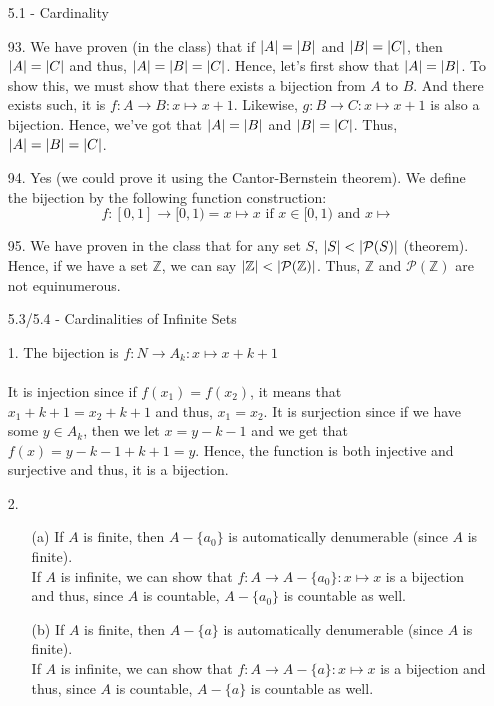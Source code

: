 \documentclass[12pt, a4paper]{article}
\newcommand{\ints}{\mathbb{Z}}
\DeclarePairedDelimiter\abs{\lvert}{\rvert}
\newcommand{\rarr}{\rightarrow}
\begin{document}
\begin{itemize}
\item[]
\item[]
\item[]

{\Large 5.1 - Cardinality}
\item[93.]
We have proven (in the class) that if $\abs{A} = \abs{B}$ and $\abs{B} = \abs{C}$, then $\abs{A} = \abs{C}$ and thus, $\abs{A} = \abs{B} = \abs{C}$.
Hence, let's first show that $\abs{A} = \abs{B}$. To show this, we must show that there exists a bijection from $A$ to $B$.
And there exists such, it is $f : A \rarr B : x \mapsto x + 1$. Likewise, $g : B \rarr C : x \mapsto x + 1$ is also a bijection.
Hence, we've got that $\abs{A} = \abs{B}$ and $\abs{B} = \abs{C}$. Thus, $\abs{A} = \abs{B} = \abs{C}$.

\item[]

\item[94.]
Yes (we could prove it using the Cantor-Bernstein theorem).
We define the bijection by the following function construction:
$$f : [0, 1] \rarr [0, 1)=  x \mapsto x \mbox{ if } x \in [0, 1) \mbox{ and  } x \mapsto $$

\item[]

\item[95.]
We have proven in the class that for any set $S$, $\abs{S} < \abs{\mathcal{P}(S)}$ (theorem).
Hence, if we have a set $\ints$, we can say $\abs{\ints} < \abs{\mathcal{P}(\ints)}$.
Thus, $\ints$ and $\mathcal{P}(\ints)$ are not equinumerous.

\item[]
\item[]

{\Large 5.3/5.4 - Cardinalities of Infinite Sets}
\item[1.]
The bijection is $f : N \rarr A_k : x \mapsto x + k + 1$ \\\\
It is injection since if $f(x_1) = f(x_2)$, it means that $x_1 + k + 1 = x_2 + k + 1$ and thus, $x_1 = x_2$.
It is surjection since if we have some $y \in A_k$, then we let $x = y - k - 1$ and we get that $f(x) = y - k - 1 + k + 1 = y$.
Hence, the function is both injective and surjective and thus, it is a bijection.

\item[2.]
\begin{itemize}
\item[(a)]
If $A$ is finite, then $A - \{a_0\}$ is automatically denumerable (since $A$ is finite).\\
If $A$ is infinite, we can show that $f : A \rarr A - \{a_0\} : x \mapsto x$ is a bijection and thus, since
$A$ is countable, $A - \{a_0\}$ is countable as well.
\item[(b)]
If $A$ is finite, then $A - \{a\}$ is automatically denumerable (since $A$ is finite).\\
If $A$ is infinite, we can show that $f : A \rarr A - \{a\} : x \mapsto x$ is a bijection and thus, since
$A$ is countable, $A - \{a\}$ is countable as well.
\end{itemize}


\end{itemize}
\end{document}
